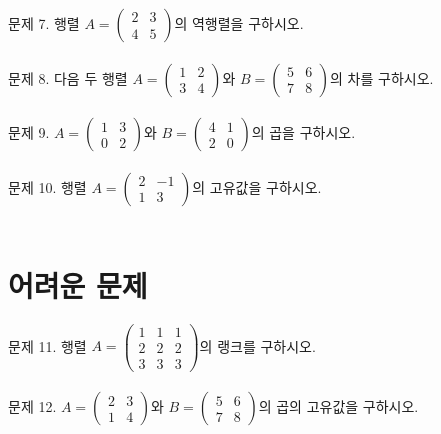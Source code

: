 \documentclass[fleqn]{article}
\begin{document}
\noindent 문제 7. 행렬 \( A = \begin{pmatrix} 2 & 3 \\ 4 & 5 \end{pmatrix} \)의 역행렬을 구하시오. \\\\

\noindent 문제 8. 다음 두 행렬 \( A = \begin{pmatrix} 1 & 2 \\ 3 & 4 \end{pmatrix} \)와 \( B = \begin{pmatrix} 5 & 6 \\ 7 & 8 \end{pmatrix} \)의 차를 구하시오. \\\\

\noindent 문제 9. \( A = \begin{pmatrix} 1 & 3 \\ 0 & 2 \end{pmatrix} \)와 \( B = \begin{pmatrix} 4 & 1 \\ 2 & 0 \end{pmatrix} \)의 곱을 구하시오. \\\\

\noindent 문제 10. 행렬 \( A = \begin{pmatrix} 2 & -1 \\ 1 & 3 \end{pmatrix} \)의 고유값을 구하시오. \\\\

\section*{어려운 문제}

\noindent 문제 11. 행렬 \( A = \begin{pmatrix} 1 & 1 & 1 \\ 2 & 2 & 2 \\ 3 & 3 & 3 \end{pmatrix} \)의 랭크를 구하시오. \\\\

\noindent 문제 12. \( A = \begin{pmatrix} 2 & 3 \\ 1 & 4 \end{pmatrix} \)와 \( B = \begin{pmatrix} 5 & 6 \\ 7 & 8 \end{pmatrix} \)의 곱의 고유값을 구하시오. \\\\
\end{document}
